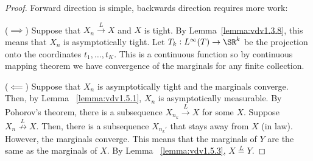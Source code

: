 \begin{proof}
	Forward direction is simple, backwards direction requires more work:

	(\(\implies\)) Suppose that \(X_n\overset{L}{\to}X\) and \(X\) is tight. By Lemma~\ref{lemma:vdv1.3.8}, this means that \(X_n\) is asymptotically tight. Let \(T_k:L^\infty(T)\to\SR^k\) be the projection onto the coordinates \(t_1,\dots,t_K\). This is a continuous function so by continuous mapping theorem we have convergence of the marginals for any finite collection.

	(\(\impliedby\)) Suppose that \(X_n\) is asymptotically tight and the marginals converge. Then, by Lemma~ \ref{lemma:vdv1.5.1}, \(X_n\) is asymptotically measurable. By Pohorov's theorem, there is a subsequence \(X_{n_k}\overset{L}{\to}X\) for some \(X\). Suppose \(X_n \overset{L}{\not\to}X\). Then, there is a subsequence \(X_{n_k'}\) that stays away from  \(X\) (in law). However, the marginals converge. This means that the marginals of  \(Y\) are the same as the marginals of  \(X\). By Lemma~ \ref{lemma:vdv1.5.3}, \(X \overset{L}{=} Y\).
\end{proof}

